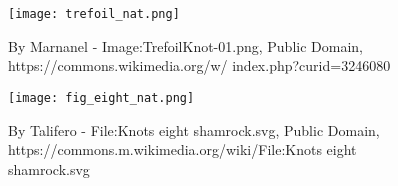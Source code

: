 \documentclass[12pt, a4paper]{article}
\begin{document}
\begin{figure}[H]
  \centering
  \texttt{[image: trefoil\_nat.png]}
  \caption[]{By Marnanel - Image:TrefoilKnot-01.png, Public Domain, https://commons.wikimedia.org/w/ index.php?curid=3246080}
\end{figure}

\begin{figure}[H]
  \centering
  \texttt{[image: fig\_eight\_nat.png]}
  \caption[]{ By Talifero - File:Knots eight shamrock.svg, Public Domain, https://commons.m.wikimedia.org/wiki/File:Knots eight shamrock.svg}
\end{figure}
\end{document}
